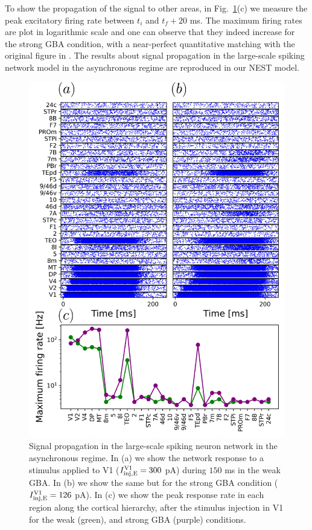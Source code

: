 To show the propagation of the signal to other areas, in Fig.~\ref{fig:fig3}(c) we measure the peak excitatory firing rate between $t_{i}$ and $t_{f}+20$ ms. The maximum firing rates are plot in logarithmic scale and one can observe that they indeed increase for the strong GBA condition, with a near-perfect quantitative matching with the original figure in \cite{joglekar2018inter}. The results about signal propagation in the large-scale spiking network model in the asynchronous regime are  reproduced in our NEST model.

\begin{figure}[!ht]
 \centering
 \includegraphics[scale=0.6]{figures/figure4.pdf}
 \caption{Signal propagation in the large-scale spiking neuron network in the asynchronous regime. In (a) we show the network response to a stimulus applied to V1 ($I_{\rm inj, E}^{\rm V1} = 300$ pA) during $150$ ms in the weak GBA. In (b) we show the same but for the strong GBA  condition ($I_{\rm inj, E}^{\rm V1} = 126$ pA). In (c) we show the peak response rate in each region along the cortical hierarchy, after the stimulus injection in V1 for the weak (green), and strong GBA (purple) conditions. }\label{fig:fig3}
\end{figure}


